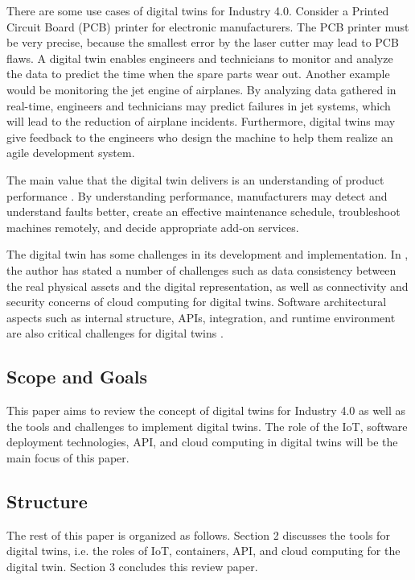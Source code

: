 \documentclass[article]{aaltoseries}
\begin{document}
There are some use cases of digital twins for Industry 4.0. Consider a Printed Circuit Board (PCB) printer for electronic manufacturers. The PCB printer must be very precise, because the smallest error by the laser cutter may lead to PCB flaws. A digital twin enables engineers and technicians to monitor and analyze the data to predict the time when the spare parts wear out. Another example would be monitoring the jet engine of airplanes. By analyzing data gathered in real-time, engineers and technicians may predict failures in jet systems, which will lead to the reduction of airplane incidents. Furthermore, digital twins may give feedback to the engineers who design the machine to help them realize an agile development system.

The main value that the digital twin delivers is an understanding of product performance \cite{Cheatshe3:online}. By understanding performance, manufacturers may detect and understand faults better, create an effective maintenance schedule, troubleshoot machines remotely, and decide appropriate add-on services.

The digital twin has some challenges in its development and implementation. In \cite{bienhaus2017patterns}, the author has stated a number of challenges such as data consistency between the real physical assets and the digital representation, as well as connectivity and security concerns of cloud computing for digital twins. Software architectural aspects such as internal structure, APIs, integration, and runtime environment are also critical challenges for digital twins \cite{malakuti2018architectural}.

\subsection{Scope and Goals}
\label{sec:emphasis}
This paper aims to review the concept of digital twins for Industry 4.0 as well as the tools and challenges to implement digital twins. The role of the IoT, software deployment technologies, API, and cloud computing in digital twins will be the main focus of this paper.

\subsection{Structure}
\label{sec:em}
The rest of this paper is organized as follows. Section 2 discusses the tools for digital twins, i.e. the roles of IoT, containers, API, and cloud computing for the digital twin. Section 3 concludes this review paper.
 
\end{document}
